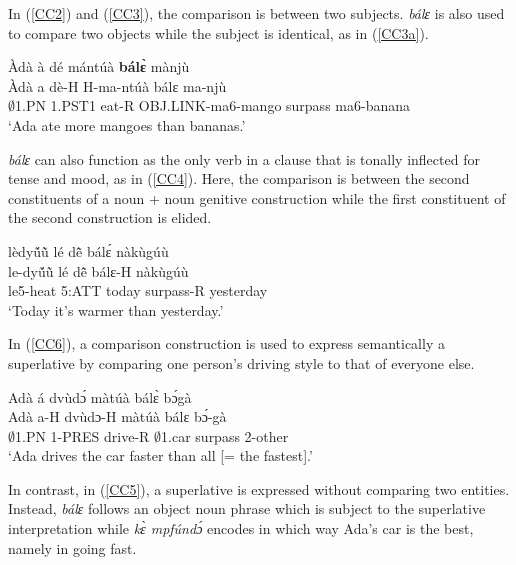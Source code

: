 In (\ref{CC2}) and (\ref{CC3}), the comparison is between two subjects. {\itshape bálɛ} is also used to compare two objects while the subject is identical, as in (\ref{CC3a}).

\begin{exe} 
\ex\label{CC3a}
  \glll Àdà à dé mántúà {\bfseries bálɛ̀} mànjù \\
        Àdà a dè-H H-ma-ntúà bálɛ ma-njù \\
       $\emptyset$1.PN 1.PST1 eat-R OBJ.LINK-ma6-mango surpass ma6-banana \\
    \trans `Ada ate more mangoes than bananas.'
\end{exe}

{\itshape bálɛ} can also function as the only verb in a clause that is tonally inflected for tense and mood, as in (\ref{CC4}). Here, the comparison is between the second constituents of a noun + noun genitive construction while the first constituent of the second construction is elided.

\begin{exe} 
\ex\label{CC4}
  \glll lèdyṹũ̀ lé dẽ̂ bálɛ́ nàkùgúù \\
        le-dyṹũ̀ lé dẽ̂ bálɛ-H nàkùgúù  \\
       le5-heat 5:ATT today surpass-R yesterday  \\
    \trans `Today it's warmer than yesterday.'
\end{exe}


In (\ref{CC6}), a comparison construction is used to express semantically a superlative by comparing one person's driving style to that of everyone else.

\begin{exe} 
\ex\label{CC6}
  \glll Adà á dvùdɔ́ màtúà bálɛ̀ bɔ́gà \\
        Adà a-H dvùdɔ-H màtúà bálɛ bɔ́-gà \\
       $\emptyset$1.PN 1-PRES drive-R $\emptyset$1.car surpass 2-other  \\
    \trans `Ada drives the car faster than all [= the fastest].'
\end{exe}


\noindent In contrast, in (\ref{CC5}), a superlative is expressed without comparing  two entities. Instead, {\itshape bálɛ} follows an object noun phrase which is subject to the superlative interpretation while {\itshape kɛ̀ mpfúndɔ́} encodes in which way Ada's car is the best, namely in going fast.


